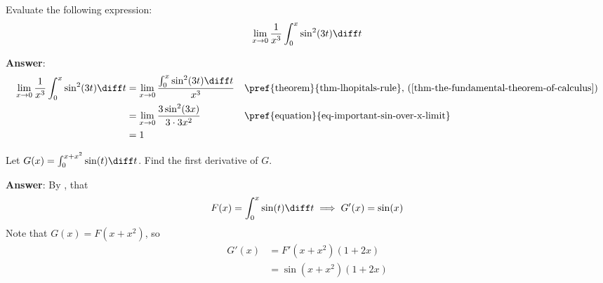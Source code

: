 \begin{exm}\label{exm-newton-leibniz-formula:2}
	Evaluate the following expression:
	\begin{equation*}
		\lim_{x\to0}\frac{1}{x^3}\int_0^x \sin^2(3t) \diff t
	\end{equation*}
	\begin{flushleft}
		\textbf{Answer}:
		\begin{align*}
			\lim_{x\to0}\frac{1}{x^3}\int_0^x \sin^2(3t) \diff t
			 & = \lim_{x\to0}\frac{\int_0^x \sin^2(3t) \diff t}{x^3} &  & \text{\pref{theorem}{thm-lhopitals-rule}, (\ref{thm-the-fundamental-theorem-of-calculus})} \\
			 & = \lim_{x\to0}\frac{3\sin^2(3x)}{3\cdot3x^2}          &  & \text{\pref{equation}{eq-important-sin-over-x-limit}}                                      \\
			 & = 1
		\end{align*}
	\end{flushleft}
\end{exm}

\begin{exm}\label{exm-newton-leibniz-formula:3}
	Let $G(x)=\int_0^{x+x^2}\sin(t)\diff t$. Find the first derivative of $G$.
	\begin{flushleft}
		\textbf{Answer}: By ,
		that
		\begin{equation*}
			F(x)=\int_0^{x}\sin(t)\diff t \implies G'(x) = \sin(x)
		\end{equation*}
		Note that $G(x)=F(x+x^2)$, so
		\begin{align*}
			G'(x) & = F'(x+x^2)(1+2x)   \\
			      & = \sin(x+x^2)(1+2x)
		\end{align*}
	\end{flushleft}
\end{exm}

